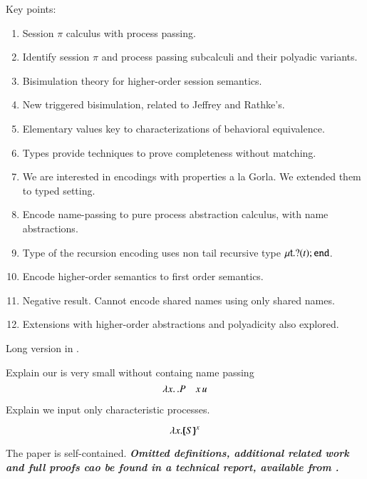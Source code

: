 Key points:
\begin{enumerate}[1.]
	\item	Session $\pi$ calculus with process passing.
	\item	Identify session $\pi$ and process passing subcalculi and their polyadic variants.
	\item	Bisimulation theory for higher-order session semantics.
	\item	New triggered bisimulation, related to Jeffrey and Rathke's.
	\item   Elementary values key to characterizations of behavioral equivalence.
	\item	Types provide techniques to prove completeness without matching.
	\item	We are interested in encodings with properties a la Gorla. 
                We extended them to typed setting. 
	\item	Encode name-passing to pure process abstraction calculus, with name abstractions.
	\item	Type of the recursion encoding uses non tail recursive type $\mu\mathsf{t}.? (t) ; \mathtt{end}$.
	\item	Encode higher-order semantics to first order semantics.
	\item	Negative result. Cannot encode shared names using only shared names.
	\item   Extensions with higher-order abstractions and polyadicity also explored.
\end{enumerate}
Long version in \cite{KouzapasPY15}.

\smallskip 

Explain our \HO is very small without containg name passing 
\[ 
\lambda x.\,.P \quad x\, {u}
\]

Explain we input only characteristic processes.  

\[
\lambda x.[\!\!(S)\!\!]^{x}
\]



The paper is self-contained. 
{\bf\em Omitted definitions, additional related work and full proofs cao be found 
in a technical report, available from \cite{KouzapasPY15}.} 
